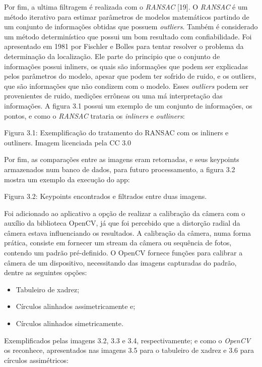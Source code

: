Por fim, a ultima filtragem é realizada com o \textit{RANSAC} [19]. O \textit{RANSAC} é um método iterativo para estimar parâmetros de modelos matemáticos partindo de um conjunto de informações obtidas que possuem \textit{outliers}. Também é considerado um método determinístico que possui um bom resultado com confiabilidade. Foi apresentado em 1981 por Fischler e Bolles para tentar resolver o problema da determinação da localização. Ele parte do principio que o conjunto de informações possui inliners, os quais são informações que podem ser explicadas pelos parâmetros do modelo, apesar que podem ter sofrido de ruido, e os outliers, que são informações que não condizem com o modelo. Esses \textit{outliers} podem ser provenientes de ruido, medições errôneas ou uma má interpretação das informações. A figura 3.1 possui um exemplo de um conjunto de informações, os pontos, e como o \textit{RANSAC} trataria os \textit{inliners} e \textit{outliners}:
  
Figura 3.1: Exemplificação do tratamento do RANSAC com os inliners e outliners. Imagem licenciada pela CC 3.0

Por fim, as comparações entre as imagens eram retornadas, e seus keypoints armazenados num banco de dados, para futuro processamento, a figura 3.2 mostra um exemplo da execução do app:


Figura 3.2: Keypoints encontrados e filtrados entre duas imagens.
 
Foi adicionado ao aplicativo a opção de realizar a calibração da câmera com o auxílio da biblioteca OpenCV, já que foi percebido que a distorção radial da câmera estava influenciando os resultados. A calibração da câmera, numa forma prática, consiste em fornecer um stream da câmera ou sequência de fotos, contendo um padrão pré-definido. O OpenCV fornece funções para calibrar a câmera de um dispositivo, necessitando das imagens capturadas do padrão, dentre as seguintes opções:

\begin{itemize}
	\item{Tabuleiro de xadrez;}
	\item{Círculos alinhados assimetricamente e;}
	\item{Círculos alinhados simetricamente.}
\end{itemize}

Exemplificados pelas imagens 3.2, 3.3 e 3.4, respectivamente; e como o \textit{OpenCV} os reconhece, apresentados nas imagens 3.5 para o tabuleiro de xadrez e 3.6 para círculos assimétricos:


